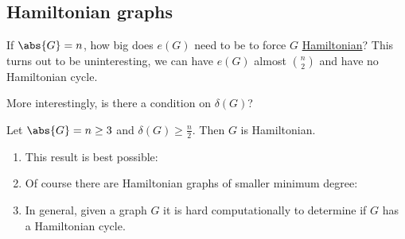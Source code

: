 \documentclass{article}
\begin{document}
\subsection{Hamiltonian graphs}
If $\abs{G} = n$, how big does $e(G)$ need to be to force $G$ \hyperlink{def:hamil}{Hamiltonian}?
This turns out to be uninteresting, we can have $e(G)$ almost $\binom{n}{2}$ and have no Hamiltonian cycle. %

More interestingly, is there a condition on $\delta(G)$?

\begin{nthm}\label{thm:17}
    Let $\abs{G} = n \geq 3$ and $\delta(G) \geq \frac{n}{2}$. Then $G$ is Hamiltonian.
\end{nthm}

\begin{remark}
    \leavevmode
    \begin{enumerate}[label=\arabic*.]
        \item This result is best possible:
        \item Of course there are Hamiltonian graphs of smaller minimum degree:
        \item In general, given a graph $G$ it is hard computationally to determine if $G$ has a Hamiltonian cycle.
    \end{enumerate}
\end{remark}
\end{document}
